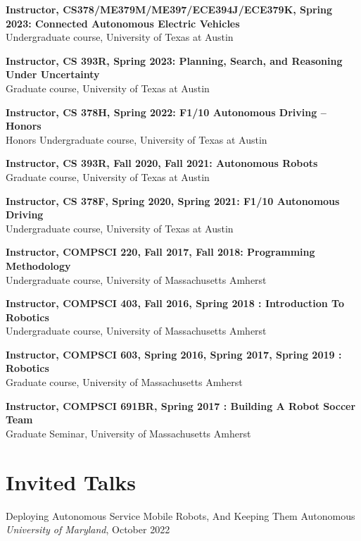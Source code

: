 \documentclass[Times]{article}
\begin{document}
{\bf Instructor, CS378/ME379M/ME397/ECE394J/ECE379K, Spring 2023: Connected  Autonomous Electric  Vehicles}\\
Undergraduate course, University of Texas at Austin

{\bf Instructor, CS 393R, Spring 2023: Planning, Search, and Reasoning Under Uncertainty}\\
Graduate course, University of Texas at Austin

{\bf Instructor, CS 378H, Spring 2022: F1/10 Autonomous Driving -- Honors}\\
Honors Undergraduate course, University of Texas at Austin

{\bf Instructor, CS 393R, Fall 2020, Fall 2021: Autonomous Robots}\\
Graduate course, University of Texas at Austin

{\bf Instructor, CS 378F, Spring 2020, Spring 2021: F1/10 Autonomous Driving}\\
Undergraduate course, University of Texas at Austin

{\bf Instructor, COMPSCI 220, Fall 2017, Fall 2018: Programming Methodology}\\
Undergraduate course, University of Massachusetts Amherst

{\bf Instructor, COMPSCI 403, Fall 2016, Spring 2018 : Introduction To
Robotics}\\
Undergraduate course, University of Massachusetts Amherst

{\bf Instructor, COMPSCI 603, Spring 2016, Spring 2017, Spring 2019 : Robotics}\\
\hfill Graduate course, University of Massachusetts Amherst

{\bf Instructor, COMPSCI 691BR, Spring 2017 : Building A Robot Soccer Team}\\
Graduate Seminar, University of Massachusetts Amherst

\begin{comment}
Updates:
5. Find all SPC, PC appointments
6. List all students
\end{comment}

\section*{Invited Talks}

Deploying Autonomous Service Mobile Robots, And Keeping Them Autonomous
\\
{\em University of Maryland}, October 2022
\end{document}
